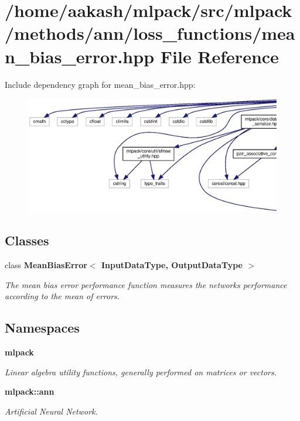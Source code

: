 \section{/home/aakash/mlpack/src/mlpack/methods/ann/loss\+\_\+functions/mean\+\_\+bias\+\_\+error.hpp File Reference}
\label{mean__bias__error_8hpp}
Include dependency graph for mean\+\_\+bias\+\_\+error.\+hpp\+:
\nopagebreak
\begin{figure}[H]
\begin{center}
\leavevmode
\includegraphics[width=350pt]{mean__bias__error_8hpp__incl}
\end{center}
\end{figure}
\subsection*{Classes}
\begin{DoxyCompactItemize}
\item 
class \textbf{ Mean\+Bias\+Error$<$ Input\+Data\+Type, Output\+Data\+Type $>$}
\begin{DoxyCompactList}\small\item\em The mean bias error performance function measures the network\textquotesingle{}s performance according to the mean of errors. \end{DoxyCompactList}\end{DoxyCompactItemize}
\subsection*{Namespaces}
\begin{DoxyCompactItemize}
\item 
 \textbf{ mlpack}
\begin{DoxyCompactList}\small\item\em Linear algebra utility functions, generally performed on matrices or vectors. \end{DoxyCompactList}\item 
 \textbf{ mlpack\+::ann}
\begin{DoxyCompactList}\small\item\em Artificial Neural Network. \end{DoxyCompactList}\end{DoxyCompactItemize}


